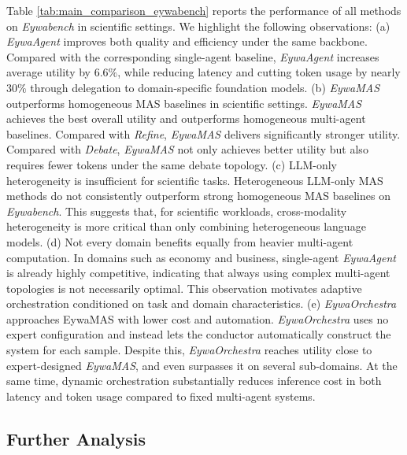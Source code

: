 Table \ref{tab:main_comparison_eywabench} reports the performance of all methods on \textit{Eywabench} in scientific settings. We highlight the following observations: (a) \textit{EywaAgent} improves both quality and efficiency under the same backbone.
Compared with the corresponding single-agent baseline, \textit{EywaAgent} increases average utility by $6.6\%$, while reducing latency and cutting token usage by nearly $30\%$ through delegation to domain-specific foundation models.
(b) \textit{EywaMAS} outperforms homogeneous MAS baselines in scientific settings.
\textit{EywaMAS} achieves the best overall utility and outperforms homogeneous multi-agent baselines. Compared with \textit{Refine}, \textit{EywaMAS} delivers significantly stronger utility. Compared with \textit{Debate}, \textit{EywaMAS} not only achieves better utility but also requires fewer tokens under the same debate topology.
(c) {LLM-only heterogeneity is insufficient for scientific tasks.} Heterogeneous LLM-only MAS methods do not consistently outperform strong homogeneous MAS baselines on \textit{Eywabench}. This suggests that, for scientific workloads, cross-modality heterogeneity is more critical than only combining heterogeneous language models.
(d) {Not every domain benefits equally from heavier multi-agent computation.} In domains such as economy and business, single-agent \textit{EywaAgent} is already highly competitive, indicating that always using complex multi-agent topologies is not necessarily optimal. This observation motivates adaptive orchestration conditioned on task and domain characteristics.
(e) \textit{EywaOrchestra} approaches EywaMAS with lower cost and automation. \textit{EywaOrchestra} uses no expert configuration and instead lets the conductor automatically construct the system for each sample. Despite this, \textit{EywaOrchestra} reaches utility close to expert-designed \textit{EywaMAS}, and even surpasses it on several sub-domains. At the same time, dynamic orchestration substantially reduces inference cost in both latency and token usage compared to fixed multi-agent systems.

\subsection{Further Analysis}



